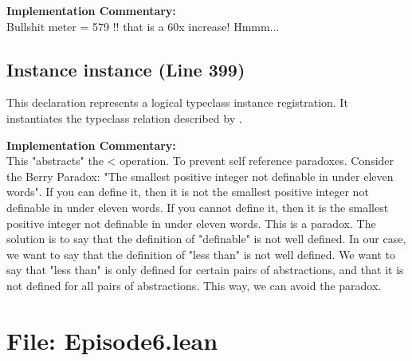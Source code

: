 \documentclass[11pt,oneside]{book}
\newcommand{\lean}[1]{\texttt{\detokenize{#1}}}
\begin{document}
\textbf{Implementation Commentary:}\\
Bullshit meter = 579 !!  that is a 60x increase!  Hmmm...

\subsection{Instance instance (Line 399)}
This declaration represents a logical typeclass instance registration. It instantiates the typeclass relation described by \lean{instance}.

\textbf{Implementation Commentary:}\\
This "abstracts" the < operation. To prevent self reference paradoxes.  Consider the
Berry Paradox: "The smallest positive integer not definable in under eleven words".  If you can define it, then it is
not the smallest positive integer not definable in under eleven words.  If you cannot define it, then it is the smallest
positive integer not definable in under eleven words.  This is a paradox.  The solution is to say that the definition
of "definable" is not well defined.  In our case, we want to say that the definition of "less than" is not well defined.
We want to say that "less than" is only defined for certain pairs of abstractions, and that it is not defined for all pairs
of abstractions.  This way, we can avoid the paradox.

\section{File: Episode6.lean}
\end{document}
